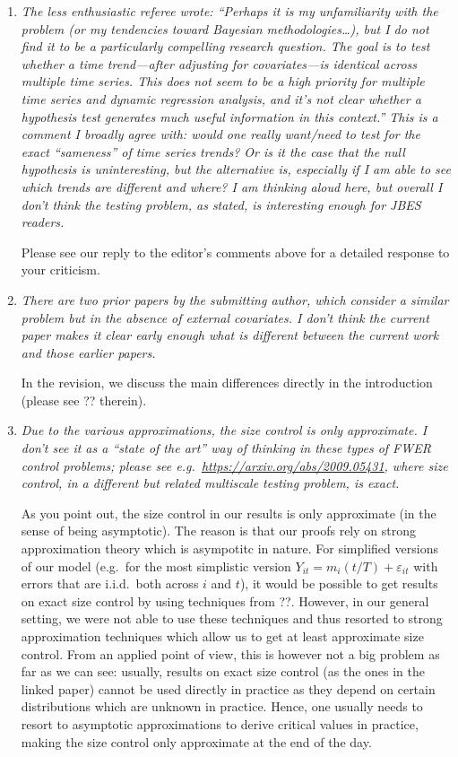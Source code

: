 \documentclass[a4paper,12pt]{article}
\begin{document}
\begin{enumerate}[label=\arabic*.,leftmargin=0.6cm]


\item \textit{The less enthusiastic referee wrote: “Perhaps it is my unfamiliarity with the problem (or my tendencies toward Bayesian methodologies…), but I do not find it to be a particularly compelling research question. The goal is to test whether a time trend—after adjusting for covariates—is identical across multiple time series. This does not seem to be a high priority for multiple time series and dynamic regression analysis, and it’s not clear whether a hypothesis test generates much useful information in this context.” This is a comment I broadly agree with: would one really want/need to test for the exact “sameness” of time series trends? Or is it the case that the null hypothesis is uninteresting, but the alternative is, especially if I am able to see which trends are different and where? I am thinking aloud here, but overall I don’t think the testing problem, as stated, is interesting enough for JBES readers.}

Please see our reply to the editor's comments above for a detailed response to your criticism. 
  

\item \textit{There are two prior papers by the submitting author, which consider a similar problem but in the absence of external covariates. I don’t think the current paper makes it clear early enough what is different between the current work and those earlier papers.}  

In the revision, we discuss the main differences directly in the introduction (please see ?? therein). 
  

\item \textit{Due to the various approximations, the size control is only approximate. I don’t see it as a ``state of the art'' way of thinking in these types of FWER control problems; please see e.g.\ \url{https://arxiv.org/abs/2009.05431},
where size control, in a different but related multiscale testing problem, is exact.}

As you point out, the size control in our results is only approximate (in the sense of being asymptotic). The reason is that our proofs rely on strong approximation theory which is asympotitc in nature. For simplified versions of our model (e.g.\ for the most simplistic version $Y_{it} = m_i(t/T) + \varepsilon_{it}$ with errors that are i.i.d.\ both across $i$ and $t$), it would be possible to get results on exact size control by using techniques from ??. However, in our general setting, we were not able to use these techniques and thus resorted to strong approximation techniques which allow us to get at least approximate size control. From an applied point of view, this is however not a big problem as far as we can see: usually, results on exact size control (as the ones in the linked paper) cannot be used directly in practice as they depend on certain distributions which are unknown in practice. Hence, one usually needs to resort to asymptotic approximations to derive critical values in practice, making the size control only approximate at the end of the day.


\end{enumerate}
\end{document}
